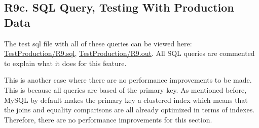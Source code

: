 \documentclass[12pt, a4paper]{article}
\begin{document}
\subsection*{R9c. SQL Query, Testing With Production Data}
The test sql file with all of these queries can be viewed here: \underline{\href{https://github.com/Kggupta/DegreeMap/tree/main/Database/Queries/TestProduction}{TestProduction/R9.sql}}, \underline{\href{https://github.com/Kggupta/DegreeMap/tree/main/Database/Queries/TestProduction}{TestProduction/R9.out}}. All SQL queries are commented to explain what it does for this feature.

This is another case where there are no performance improvements to be made. This is because all queries are based of the primary key. As mentioned before, MySQL by default makes the primary key a clustered index which means that the joins and equality comparisons are all already optimized in terms of indexes. Therefore, there are no performance improvements for this section.
\end{document}
